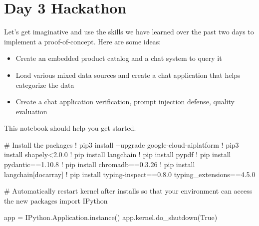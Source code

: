 \documentclass[
  letterpaper,
  DIV=11,
  numbers=noendperiod]{scrreprt}
\newenvironment{Shaded}{\begin{snugshade}}{\end{snugshade}}
\newcommand{\CommentTok}[1]{\textcolor[rgb]{0.37,0.37,0.37}{#1}}
\newcommand{\FloatTok}[1]{\textcolor[rgb]{0.68,0.00,0.00}{#1}}
\newcommand{\ImportTok}[1]{\textcolor[rgb]{0.00,0.46,0.62}{#1}}
\newcommand{\NormalTok}[1]{\textcolor[rgb]{0.00,0.23,0.31}{#1}}
\newcommand{\OperatorTok}[1]{\textcolor[rgb]{0.37,0.37,0.37}{#1}}
\newcommand{\VariableTok}[1]{\textcolor[rgb]{0.07,0.07,0.07}{#1}}
\begin{document}

\hypertarget{day-3-hackathon}{%
\chapter{Day 3 Hackathon}\label{day-3-hackathon}}

Let's get imaginative and use the skills we have learned over the past
two days to implement a proof-of-concept. Here are some ideas:

\begin{itemize}
\item
  Create an embedded product catalog and a chat system to query it
\item
  Load various mixed data sources and create a chat application that
  helps categorize the data
\item
  Create a chat application verification, prompt injection defense,
  quality evaluation
\end{itemize}

This notebook should help you get started.

\begin{Shaded}
\begin{Highlighting}[]
\CommentTok{\# Install the packages}
\OperatorTok{!}\NormalTok{ pip3 install }\OperatorTok{{-}{-}}\NormalTok{upgrade google}\OperatorTok{{-}}\NormalTok{cloud}\OperatorTok{{-}}\NormalTok{aiplatform}
\OperatorTok{!}\NormalTok{ pip3 install shapely}\OperatorTok{\textless{}}\FloatTok{2.0.0}
\OperatorTok{!}\NormalTok{ pip install langchain}
\OperatorTok{!}\NormalTok{ pip install pypdf}
\OperatorTok{!}\NormalTok{ pip install pydantic}\OperatorTok{==}\FloatTok{1.10.8}
\OperatorTok{!}\NormalTok{ pip install chromadb}\OperatorTok{==}\FloatTok{0.3.26}
\OperatorTok{!}\NormalTok{ pip install langchain[docarray]}
\OperatorTok{!}\NormalTok{ pip install typing}\OperatorTok{{-}}\NormalTok{inspect}\OperatorTok{==}\FloatTok{0.8.0}\NormalTok{ typing\_extensions}\OperatorTok{==}\FloatTok{4.5.0}
\end{Highlighting}
\end{Shaded}

\begin{Shaded}
\begin{Highlighting}[]
\CommentTok{\# Automatically restart kernel after installs so that your environment can access the new packages}
\ImportTok{import}\NormalTok{ IPython}

\NormalTok{app }\OperatorTok{=}\NormalTok{ IPython.Application.instance()}
\NormalTok{app.kernel.do\_shutdown(}\VariableTok{True}\NormalTok{)}
\end{Highlighting}
\end{Shaded}
\end{document}
